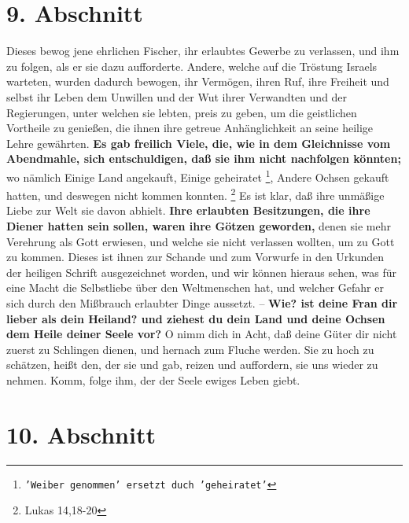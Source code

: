 \section{9. Abschnitt} \label{kap4_ab9}

Dieses bewog jene ehrlichen Fischer, ihr erlaubtes Gewerbe zu verlassen, und ihm
zu folgen, als er sie dazu aufforderte. Andere, welche auf die Tröstung Israels
warteten, wurden dadurch bewogen, ihr Vermögen, ihren Ruf, ihre Freiheit und
selbst ihr Leben dem Unwillen und der Wut ihrer Verwandten und der
Regierungen, unter welchen sie lebten, preis zu geben, um die geistlichen
Vortheile zu genießen, die ihnen ihre getreue Anhänglichkeit an seine heilige
Lehre gewährten. \textbf{Es gab freilich Viele, die, wie in dem Gleichnisse vom
Abendmahle, sich entschuldigen, daß sie ihm nicht nachfolgen könnten;} wo
nämlich
Einige Land angekauft, Einige geheiratet \footnote{\texttt{'Weiber genommen' ersetzt
duch 'geheiratet'}}, Andere Ochsen gekauft hatten, und
deswegen nicht kommen konnten.
\footnote{Lukas  14,18-20}
Es ist klar, daß ihre
unmäßige Liebe zur Welt sie davon abhielt. \textbf{Ihre erlaubten Besitzungen,
die ihre
Diener hatten sein sollen, waren ihre Götzen  geworden,} denen sie
mehr Verehrung
als Gott erwiesen, und welche sie nicht verlassen wollten, um zu Gott zu kommen.
Dieses ist ihnen zur Schande und zum Vorwurfe in den Urkunden der heiligen
Schrift ausgezeichnet worden, und wir können hieraus sehen, was für eine Macht
die Selbstliebe über den Weltmenschen hat, und welcher Gefahr er sich durch den
Mißbrauch erlaubter Dinge aussetzt. -- \textbf{Wie? ist deine Fran dir lieber
als dein
Heiland? und ziehest du dein Land und deine Ochsen dem Heile deiner Seele vor?}
O
nimm dich in Acht, daß deine Güter dir nicht zuerst zu Schlingen dienen, und
hernach zum Fluche werden. Sie zu hoch zu schätzen, heißt den, der sie und gab,
reizen und auffordern, sie uns wieder zu nehmen. Komm, folge ihm, der der Seele
ewiges Leben giebt.

\section{10. Abschnitt} \label{kap4_ab10}

